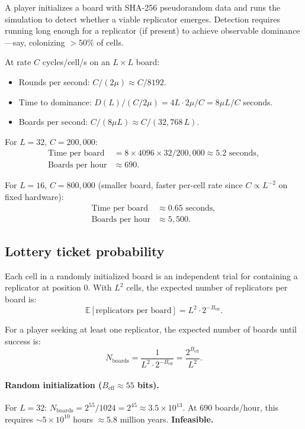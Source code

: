 \documentclass{article}
\newcommand{\Beff}{B_{\mathrm{eff}}}
\begin{document}
A player initializes a board with SHA-256 pseudorandom data and runs
the simulation to detect whether a viable replicator emerges. Detection
requires running long enough for a replicator (if present) to achieve
observable dominance---say, colonizing $> 50\%$ of cells.

At rate $C$ cycles/cell/s on an $L \times L$ board:
\begin{itemize}
\item Rounds per second: $C / (2\mu) \approx C / 8192$.
\item Time to dominance: $D(L) / (C / 2\mu) = 4L \cdot 2\mu / C
  = 8\mu L / C$ seconds.
\item Boards per second: $C / (8\mu L) \approx C / (32{,}768 \, L)$.
\end{itemize}

For $L = 32$, $C = 200{,}000$:
\begin{align*}
\text{Time per board} &= 8 \times 4096 \times 32 / 200{,}000
  \approx 5.2 \text{ seconds}, \\
\text{Boards per hour} &\approx 690.
\end{align*}

For $L = 16$, $C = 800{,}000$ (smaller board, faster per-cell rate
since $C \propto L^{-2}$ on fixed hardware):
\begin{align*}
\text{Time per board} &\approx 0.65 \text{ seconds}, \\
\text{Boards per hour} &\approx 5{,}500.
\end{align*}

\subsection{Lottery ticket probability}

Each cell in a randomly initialized board is an independent trial for
containing a replicator at position 0. With $L^2$ cells, the expected
number of replicators per board is:
\[
\mathbb{E}[\text{replicators per board}] = L^2 \cdot 2^{-\Beff}.
\]

For a player seeking at least one replicator, the expected number of
boards until success is:
\[
N_{\text{boards}} = \frac{1}{L^2 \cdot 2^{-\Beff}} = \frac{2^{\Beff}}{L^2}.
\]

\paragraph{Random initialization ($\Beff \approx 55$ bits).}
For $L = 32$: $N_{\text{boards}} = 2^{55} / 1024 = 2^{45} \approx
3.5 \times 10^{13}$. At 690 boards/hour, this requires $\sim 5 \times
10^{10}$ hours $\approx 5.8$ million years. \textbf{Infeasible.}
\end{document}
